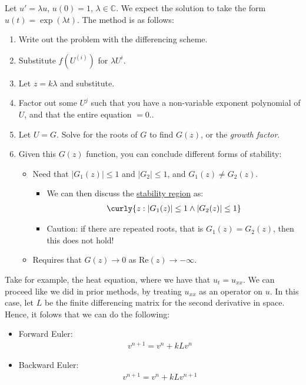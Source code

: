 \documentclass{article}
\begin{document}
 Let $u' = \lambda u$, $u(0) = 1$, $\lambda \in \mathbb{C}$. We expect the solution to take the form $u(t) = \exp(\lambda t)$. The method is as follows:
\begin{enumerate}
\item Write out the problem with the differencing scheme.
\item Substitute $f(U^{(i)})$ for $\lambda U^{i}$.
\item Let $z = k\lambda$ and substitute.
\item Factor out some $U^{j}$ such that you have a non-variable exponent polynomial of $U$, and that the entire equation $=0$..
\item Let $U = G$. Solve for the roots of $G$ to find $G(z)$, or the \textit{growth factor}.
\item Given this $G(z)$ function, you can conclude different forms of stability:
  \begin{itemize}
  \item {} Need that $|G_1(z)| \leq 1$ and $|G_2| \leq 1$, and $G_1(z) \neq G_2(z)$.
    \begin{itemize}
    \item We can then discuss the \underline{stability region} as:
      \begin{align*}
        \curly{z : |G_1(z)| \leq 1 \wedge |G_2(z)| \leq 1}
      \end{align*}
    \item Caution: if there are repeated roots, that is $G_1(z) = G_2(z)$, then this does not hold!
    \end{itemize}
    \item {} Requires that $G(z) \to 0$ as $\text{Re}(z) \to -\infty$.
  \end{itemize}

\end{enumerate}


\pagebreak


 Take for example, the heat equation, where we have that $u_t = u_{xx}$. We can proceed like we did in prior methods, by treating $u_{xx}$ as an operator on $u$. In this case, let $L$ be the finite differencing matrix for the second derivative in space. Hence, it folows that we can do the following:
\begin{itemize}
\item Forward Euler:
  \begin{align*}
    v^{n+ 1} = v^{n} + kLv^{n}
  \end{align*}
\item Backward Euler:
  \begin{align*}
    v^{n + 1} = v^n + kLv^{n + 1}
  \end{align*}
\end{itemize}
\end{document}
